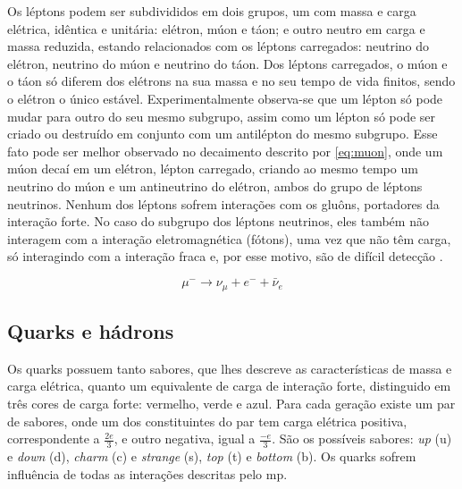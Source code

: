 Os léptons podem ser subdivididos em dois grupos, 
um com massa e carga elétrica, idêntica e unitária: elétron, múon e táon; 
e outro neutro em carga e massa reduzida, estando relacionados com os léptons
carregados: neutrino do elétron, neutrino do múon e neutrino do táon. Dos
léptons carregados, o múon e o táon só diferem dos elétrons na sua massa e no
seu tempo de vida finitos, sendo o elétron o único estável.
Experimentalmente observa-se que um lépton só pode mudar para outro do seu mesmo
subgrupo, assim como um lépton só pode ser criado ou destruído em conjunto com
um antilépton do mesmo subgrupo. Esse fato pode ser melhor observado no
decaimento descrito por \ref{eq:muon}, onde um múon decaí em um
elétron, lépton carregado, criando ao mesmo tempo um neutrino do múon e um
antineutrino do elétron, ambos do grupo de léptons neutrinos.
Nenhum dos léptons sofrem interações com os gluôns, portadores da interação forte.
No caso do subgrupo dos léptons neutrinos, eles também não interagem com a
interação eletromagnética (fótons), 
uma vez que não têm carga, só interagindo com a interação fraca e, por esse motivo,
são de difícil detecção \cite{Intro_Nuclear,Intro_Standard}.

\begin{equation} \label{eq:muon}
\mu^{-} \rightarrow \nu_{\mu} + e^- + \bar{\nu}_{e}
\end{equation}

\subsection{Quarks e hádrons}
\label{ssec:quarks}

Os quarks possuem tanto sabores, que lhes descreve as características de massa e
carga elétrica, quanto um equivalente de carga de interação
forte, distinguido em três cores de carga forte: vermelho, verde e azul. 
Para cada geração existe um par de sabores, onde um dos constituintes do par tem
carga elétrica positiva, correspondente a $\frac{2e}{3}$,
e outro negativa, igual a $\frac{-e}{3}$. São os possíveis sabores: \emph{up}
(u) e \emph{down} (d), \emph{charm} (c) e \emph{strange} (s), \emph{top} (t) e
\emph{bottom} (b). Os quarks sofrem influência de todas as interações descritas
pelo \gls{mp}.


